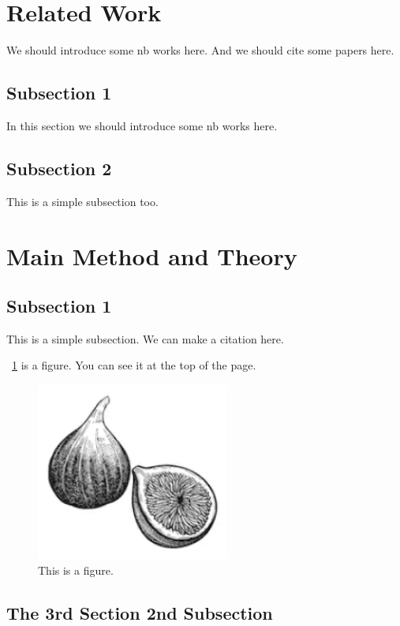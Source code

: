 \documentclass[lettersize,journal,12pt]{IEEEtran}
\begin{document}
\section{Related Work}

We should introduce some nb works here.
And we should cite some papers here.

\subsection{Subsection 1}

In this section we should introduce some nb works here.

\subsection{Subsection 2}

This is a simple subsection too.

\section{Main Method and Theory}



\subsection{Subsection 1}

This is a simple subsection. 
We can make a citation here. \cite{ref1}

\figurename~\ref{fig2} is a figure. You can see it at the top of the page.

\begin{figure}[!t]
	\centering
	\includegraphics[width=2.5in]{images/fig1.png}
	\caption{This is a figure.}
	\label{fig2}
\end{figure}

\subsection{The 3rd Section 2nd Subsection}
\end{document}
